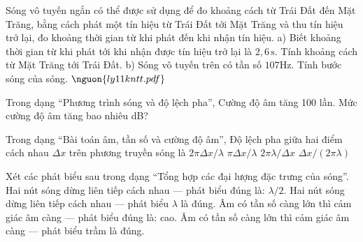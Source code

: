 \begin{ex}
Sóng vô tuyến ngắn có thể được sử dụng để đo khoảng cách từ Trái Đất đến Mặt Trăng, bằng cách phát một tín hiệu từ Trái Đất tới Mặt Trăng và thu tín hiệu trở lại, đo khoảng thời gian từ khi phát đến khi nhận tín hiệu. a) Biết khoảng thời gian từ khi phát tới khi nhận được tín hiệu trở lại là $2,6\,\mathrm{s}$. Tính khoảng cách từ Mặt Trăng tới Trái Đất. b) Sóng vô tuyến trên có tần số $107 \mathrm{Hz}$. Tính bước sóng của sóng. $\nguon{ly11 kntt.pdf}$
\choiceTF

\end{ex}

\begin{ex}
Trong dạng “Phương trình sóng và độ lệch pha”, Cường độ âm tăng 100 lần. Mức cường độ âm tăng bao nhiêu dB?
\end{ex}

\begin{ex}
Trong dạng “Bài toán âm, tần số và cường độ âm”, Độ lệch pha giữa hai điểm cách nhau $\Delta x$ trên phương truyền sóng là
\choice
{\True $2\pi\Delta x/\lambda$}
{$\pi\Delta x/\lambda$}
{$2\pi\lambda/\Delta x$}
{$\Delta x/(2\pi\lambda)$}
\end{ex}

\begin{ex}
Xét các phát biểu sau trong dạng “Tổng hợp các đại lượng đặc trưng của sóng”.
\choiceTF
{\True Hai nút sóng dừng liên tiếp cách nhau — phát biểu đúng là: $\lambda/2$.}
{Hai nút sóng dừng liên tiếp cách nhau — phát biểu $\lambda$ là đúng.}
{\True Âm có tần số càng lớn thì cảm giác âm càng — phát biểu đúng là: cao.}
{Âm có tần số càng lớn thì cảm giác âm càng — phát biểu trầm là đúng.}
\end{ex}

